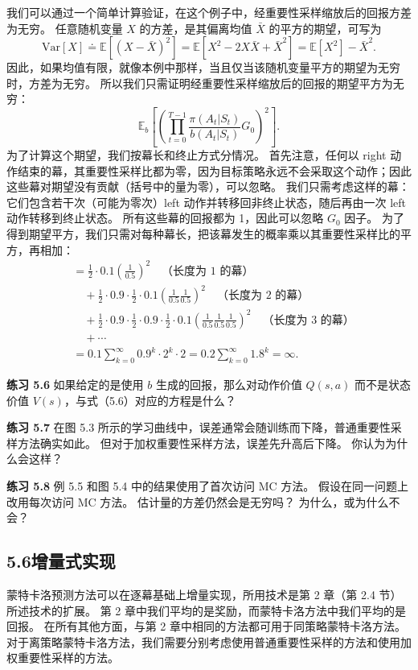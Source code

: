\documentclass[UTF8, 12pt, fontset=fandol, oneside]{ctexart}
\begin{document}
我们可以通过一个简单计算验证，在这个例子中，经重要性采样缩放后的回报方差为无穷。
任意随机变量 $X$ 的方差，是其偏离均值 $\bar X$ 的平方的期望，可写为
\[
\mathrm{Var}[X]\doteq
\mathbb{E}\!\left[(X-\bar X)^2\right]
=\mathbb{E}[X^2-2X\bar X+\bar X^2]
=\mathbb{E}[X^2]-\bar X^2.
\]
因此，如果均值有限，就像本例中那样，当且仅当该随机变量平方的期望为无穷时，方差为无穷。
所以我们只需证明经重要性采样缩放后的回报的期望平方为无穷：
\[
\mathbb{E}_b\!\left[
\left(
\prod_{t=0}^{T-1}\frac{\pi(A_t|S_t)}{b(A_t|S_t)}G_0
\right)^2
\right].
\]
为了计算这个期望，我们按幕长和终止方式分情况。
首先注意，任何以 right 动作结束的幕，其重要性采样比都为零，因为目标策略永远不会采取这个动作；因此这些幕对期望没有贡献（括号中的量为零），可以忽略。
我们只需考虑这样的幕：它们包含若干次（可能为零次）left 动作并转移回非终止状态，随后再由一次 left 动作转移到终止状态。
所有这些幕的回报都为 1，因此可以忽略 $G_0$ 因子。
为了得到期望平方，我们只需对每种幕长，把该幕发生的概率乘以其重要性采样比的平方，再相加：
\[
\begin{aligned}
&= \frac12\cdot 0.1\left(\frac{1}{0.5}\right)^2
\quad\text{（长度为 1 的幕）}\\
&\quad + \frac12\cdot 0.9\cdot\frac12\cdot 0.1
\left(\frac{1}{0.5}\frac{1}{0.5}\right)^2
\quad\text{（长度为 2 的幕）}\\
&\quad + \frac12\cdot 0.9\cdot\frac12\cdot 0.9\cdot\frac12\cdot 0.1
\left(\frac{1}{0.5}\frac{1}{0.5}\frac{1}{0.5}\right)^2
\quad\text{（长度为 3 的幕）}\\
&\quad + \cdots\\
&=0.1\sum_{k=0}^{\infty}0.9^k\cdot 2^k\cdot 2
=0.2\sum_{k=0}^{\infty}1.8^k
=\infty.
\end{aligned}
\]

\noindent\textbf{练习 5.6}
如果给定的是使用 $b$ 生成的回报，那么对动作价值 $Q(s,a)$ 而不是状态价值 $V(s)$，与式（5.6）对应的方程是什么？

\noindent\textbf{练习 5.7}
在图 5.3 所示的学习曲线中，误差通常会随训练而下降，普通重要性采样方法确实如此。
但对于加权重要性采样方法，误差先升高后下降。
你认为为什么会这样？

\noindent\textbf{练习 5.8}
例 5.5 和图 5.4 中的结果使用了首次访问 MC 方法。
假设在同一问题上改用每次访问 MC 方法。
估计量的方差仍然会是无穷吗？
为什么，或为什么不会？

\subsection*{5.6\quad 增量式实现}

蒙特卡洛预测方法可以在逐幕基础上增量实现，所用技术是第 2 章（第 2.4 节）所述技术的扩展。
第 2 章中我们平均的是奖励，而蒙特卡洛方法中我们平均的是回报。
在所有其他方面，与第 2 章中相同的方法都可用于同策略蒙特卡洛方法。
对于离策略蒙特卡洛方法，我们需要分别考虑使用普通重要性采样的方法和使用加权重要性采样的方法。
\end{document}
